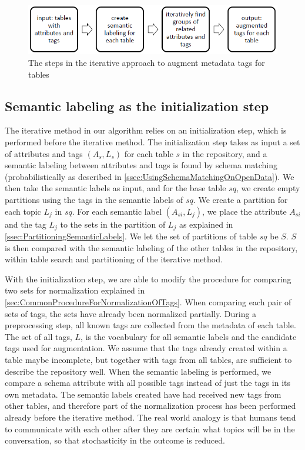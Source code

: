 \begin{figure}
    \centering
    \includegraphics[width=5in]{figures/the-steps-iterative-approach.png}
    \caption{The steps in the iterative approach to augment metadata tags for tables}
    \label{fig:the-steps-iterative-approach}
\end{figure}

\subsection{Semantic labeling as the initialization step}
\label{ssec:SemanticLabelingAsTheInitializationStep}

The iterative method in our algorithm relies on an initialization step, which is performed before the iterative method. The initialization step takes as input a set of attributes and tags $(A_{s},L_{s})$ for each table $s$ in the repository, and a semantic labeling between attributes and tags is found by schema matching (probabilistically as described in \autoref{ssec:UsingSchemaMatchingOnOpenData}). We then take the semantic labels as input, and for the base table $sq$, we create empty partitions using the tags in the semantic labels of $sq$. We create a partition for each topic $L_{j}$ in $sq$. For each semantic label $(A_{si},L_{j})$, we place the attribute $A_{si}$ and the tag $L_{j}$ to the sets in the partition of $L_{j}$ as explained in \autoref{ssec:PartitioningSemanticLabels}. We let the set of partitions of table $sq$ be $S$. $S$ is then compared with the semantic labeling of the other tables in the repository, within table search and partitioning of the iterative method.

With the initialization step, we are able to modify the procedure for comparing two sets for normalization explained in \autoref{sec:CommonProcedureForNormalizationOfTags}. When comparing each pair of sets of tags, the sets have already been normalized partially. During a preprocessing step, all known tags are collected from the metadata of each table. The set of all tags, $L$, is the vocabulary for all semantic labels and the candidate tags used for augmentation. We assume that the tags already created within a table maybe incomplete, but together with tags from all tables, are sufficient to describe the repository well. When the semantic labeling is performed, we compare a schema attribute with all possible tags instead of just the tags in its own metadata. The semantic labels created have had received new tags from other tables, and therefore part of the normalization process has been performed already before the iterative method. The real world analogy is that humans tend to communicate with each other after they are certain what topics will be in the conversation, so that stochasticity in the outcome is reduced.

